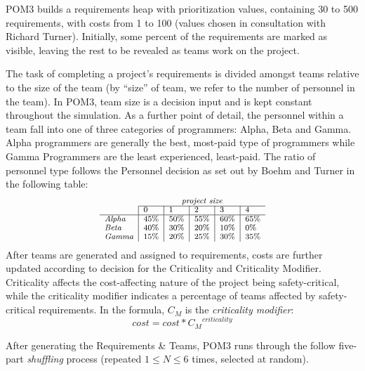 \documentclass[10pt,journal,compsoc]{IEEEtran}
\begin{document}
   POM3 builds a requirements heap with prioritization values,
    containing
     30 to 500 requirements, with costs from 1 to 100 (values 
     chosen in consultation with Richard Turner).  Initially,
    some percent of the requirements are marked
    as visible, leaving the rest to be revealed as teams work on the
    project.

The task of completing a project's requirements is divided amongst teams
    relative to the size of the team (by ``size'' of team, we refer to
    the number of personnel in the team).  In POM3, team size is a decision
    input and is kept constant throughout the simulation.  As a further
    point of detail, the personnel within a team fall into one of three
    categories of programmers: Alpha, Beta and Gamma.  Alpha programmers
    are generally the best, most-paid type of programmers while Gamma
    Programmers are the least experienced, least-paid.  The ratio of personnel type
    follows the Personnel decision as set out by Boehm and Turner\cite{1204376} in the following table:    
    \[\scriptsize
    \begin{array}{l|l|l|l|l|l}
             \multicolumn{1}{c}{~}   & \multicolumn{5}{c}{\textit{project size}}\\\cline{2-6}
                & 0    & 1    & 2    & 3    & 4    \\ \hline
            \textit{Alpha} & 45\% & 50\% & 55\% & 60\% & 65\% \\ 
            \textit{Beta}  & 40\% & 30\% & 20\% & 10\% & 0\%  \\ 
            \textit{Gamma} & 15\% & 20\% & 25\% & 30\% & 35\% \\ 
        \end{array}
    \]
    After teams are generated and assigned to requirements, costs are
    further updated according to decision for the Criticality and
    Criticality Modifier.  Criticality affects the
    cost-affecting nature of the project being safety-critical, while the
    criticality modifier indicates a percentage of teams affected by
    safety-critical requirements.  In the formula, $C_M$ is the {\em criticality
    modifier}:
    \begin{equation}\label{eq:cmcrit}
    \textit{cost} = \textit{cost} * {C_M}^{\textit{criticality}}
    \end{equation}
    
After generating the
    Requirements \& Teams, POM3 runs through the follow five-part {\em shuffling} 
    process (repeated   \mbox{$1 \le N \le 6$} times, selected
    at random).
    
\end{document}
